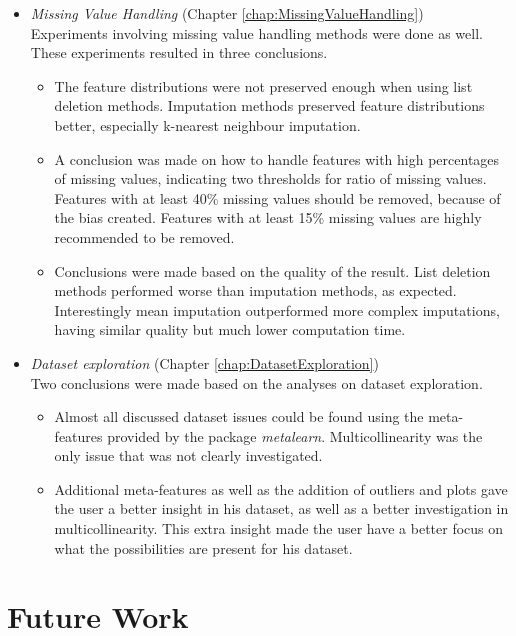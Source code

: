 \documentclass[10pt,a4paper]{report}
\begin{document}
\begin{itemize}
	\item \textit{Missing Value Handling} (Chapter \ref{chap:MissingValueHandling}) \\
	Experiments involving missing value handling methods were done as well. These experiments resulted in three conclusions.
	\begin{itemize}
		\item The feature distributions were not preserved enough when using list deletion methods. Imputation methods preserved feature distributions better, especially k-nearest neighbour imputation.
		\item %
		A conclusion was made on how to handle features with high percentages of missing values, indicating two thresholds for ratio of missing values. Features with at least 40\% missing values should be removed, because of the bias created. Features with at least 15\% missing values are highly recommended to be removed.
		\item Conclusions were made based on the quality of the result. List deletion methods performed worse than imputation methods, as expected. Interestingly mean imputation outperformed more complex imputations, having similar quality but much lower computation time. 
	\end{itemize}
	
	\item \textit{Dataset exploration} (Chapter \ref{chap:DatasetExploration})\\
	Two conclusions were made based on the analyses on dataset exploration.
	\begin{itemize}
		\item Almost all discussed dataset issues could be found using the meta-features provided by the package \textit{metalearn}. Multicollinearity was the only issue that was not clearly investigated.
		\item Additional meta-features as well as the addition of outliers and plots gave the user a better insight in his dataset, as well as a better investigation in multicollinearity. This extra insight made the user have a better focus on what the possibilities are present for his dataset.
	\end{itemize}

	\end{itemize}
	
	\section{Future Work}
	\label{CCsec:Discussions}
	
\end{document}

